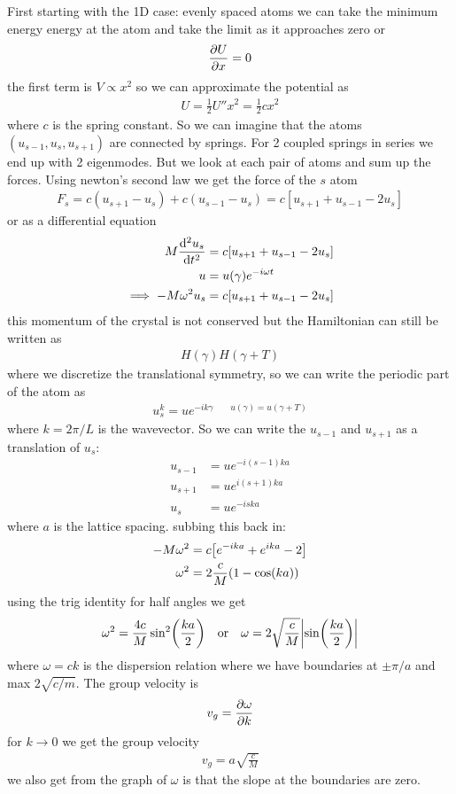 \documentclass[../main.tex]{subfiles}
\begin{document}
First starting with the 1D case: evenly spaced atoms we can take the minimum energy energy at the
atom and take the limit as it approaches zero or
\begin{align*}
    \pdv{U}{x} = 0
\end{align*}
the first term is $V \propto x^2$ so we can approximate the potential as
\begin{align*}
    U = \frac{1}{2} U'' x^2 = \frac{1}{2} c x^2
\end{align*}
where $c$ is the spring constant. So we can imagine that the atoms $(u_{s-1}, u_s, u_{s+1})$ are
connected by springs. For 2 coupled springs in series we end up with 2 eigenmodes. But we look at
each pair of atoms and sum up the forces. Using newton's second law we get the force of the $s$ atom 
\begin{align*}
    F_s = c (u_{s+1} - u_s) + c (u_{s-1} - u_s) = c [u_{s+1} + u_{s-1} - 2u_s]
\end{align*}
or as a differential equation
\begin{align*}
    M \dv[2]{u_s}{t} &= c [u_{s+1} + u_{s-1} - 2u_s] \\
    u &= u(\gamma) e^{-i\omega t} \\
    \implies -M \omega^2 u_s &= c [u_{s+1} + u_{s-1} - 2u_s]
\end{align*}
this momentum of the crystal is not conserved but the Hamiltonian can still be written as
\begin{align*}
    H(\gamma) H(\gamma + T)
\end{align*}
where we discretize the translational symmetry, so we can write the periodic part of the atom as
\begin{align*}
    u_s^k = u e^{-ik\gamma \qquad u(\gamma) = u(\gamma + T)}
\end{align*}
where $k = 2\pi/L$ is the wavevector. So we can write the $u_{s-1}$ and $u_{s+1}$ as a translation
of $u_s$:
\begin{align*}
    u_{s-1} &= u e^{-i(s-1)ka} \\
    u_{s+1} &= u e^{i(s+1)ka} \\
    u_s &= u e^{-iska}
\end{align*}
where $a$ is the lattice spacing. subbing this back in:
\begin{align*}
    -M \omega^2 &= c \qt[e^{-ika} + e^{ika} - 2] \\
    \omega^2 &= 2 \frac{c}{M} (1 - \cos(ka))
\end{align*}
using the trig identity for half angles we get 
\begin{align*}
    \omega^2 = \frac{4c}{M} \sin[2](\frac{ka}{2}) \qor
    \omega = 2\sqrt{\frac{c}{M}} \abs{\sin(\frac{ka}{2})}
\end{align*}
where $\omega = ck$ is the dispersion relation where we have boundaries at
$\pm \pi/a$ and max $2\sqrt{c/m}$. The group velocity is
\begin{align*}
    v_g = \pdv{\omega}{k}
\end{align*}
for $k \to 0$ we get the group velocity
\begin{align*}
    v_g = a \sqrt{\frac{c}{M}}
\end{align*}
we also get from the graph of $\omega$ is that the slope at the boundaries are zero. 
\end{document}
